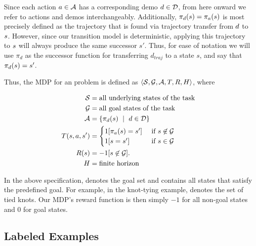 Since each action $a \in \mathcal{A}$ has a corresponding demo $d
\in \mathcal{D}$, from here onward we refer to actions and demos
interchangeably. Additionally, $\pi_{d}(s) =
\pi_{a}(s)$ is most precisely defined as the trajectory that is
found via trajectory transfer from $d$ to $s$. However, since our
transition model is deterministic, applying this trajectory to $s$ will
always produce the same successor $s'$. Thus, for ease of notation we will use
$\pi_{d}$ as the successor function for transferring $d_{traj}$ to a state $s$,
and say that $\pi_{d}(s) = s'$.

Thus, the MDP for an \mmql{} problem is defined as
$\langle\mathcal{S},\mathcal{G},\mathcal{A},T,R,H\rangle$, where

\begin{equation}
\begin{aligned}
\stateset{} &=  \text{all underlying states of the task} \\
\goalset{} &=  \text{all goal states of the task} \\
\actionset{} &= \{\policysub{\demovar{}}{\statevar{}}\ \mid \text{ } \demovar{} \in \demoset{}\} \\
\transitionfn{}(\statevar{}, \actionvar{}, \nextstatevar{}) &=
    \begin{cases}
    1[\policysub{\actionvar{}}{\statevar{}} = \nextstatevar{}] &\text{ if } \statevar{} \not \in \goalset{} \\
    1[\statevar{} = \statevar{}'] &\text{ if } \statevar{} \in \goalset{}
    \end{cases}\\
\rewardfn{}(\statevar{}) &= -1 {[ \statevar{} \not \in \goalset{} ]}. \\
H &= \text{finite horizon}
\end{aligned}
\label{eq:mdp}
\end{equation}

In the above specification, \goalset{} denotes the goal set and contains all
states that satisfy the predefined goal. For example, in the knot-tying example,
\goalset{} denotes the set of tied knots.  Our MDP's reward function is then
simply $-1$ for all non-goal states and $0$ for goal states.

\subsection{Labeled Examples}
\label{subsec:labeledex}

